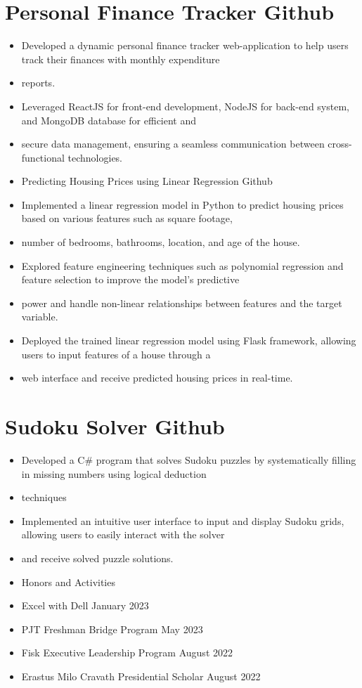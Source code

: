 \documentclass[letterpaper,10pt]{article}
\begin{document}
\section{Personal Finance Tracker Github}
\begin{itemize}
  \item Developed a dynamic personal finance tracker web-application to help users track their finances with monthly expenditure
  \item reports.
  \item Leveraged ReactJS for front-end development, NodeJS for back-end system, and MongoDB database for efficient and
  \item secure data management, ensuring a seamless communication between cross-functional technologies.
  \item Predicting Housing Prices using Linear Regression Github
  \item Implemented a linear regression model in Python to predict housing prices based on various features such as square footage,
  \item number of bedrooms, bathrooms, location, and age of the house.
  \item Explored feature engineering techniques such as polynomial regression and feature selection to improve the model’s predictive
  \item power and handle non-linear relationships between features and the target variable.
  \item Deployed the trained linear regression model using Flask framework, allowing users to input features of a house through a
  \item web interface and receive predicted housing prices in real-time.
\end{itemize}





\section{Sudoku Solver Github}
\begin{itemize}
  \item Developed a C\# program that solves Sudoku puzzles by systematically filling in missing numbers using logical deduction
  \item techniques
  \item Implemented an intuitive user interface to input and display Sudoku grids, allowing users to easily interact with the solver
  \item and receive solved puzzle solutions.
  \item Honors and Activities
  \item Excel with Dell January 2023
  \item PJT Freshman Bridge Program May 2023
  \item Fisk Executive Leadership Program August 2022
  \item Erastus Milo Cravath Presidential Scholar August 2022
\end{itemize}
\end{document}

